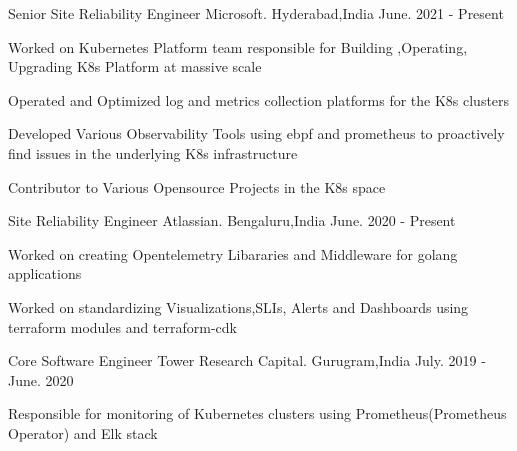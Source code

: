 

\begin{cventries}

    \cventry
    {Senior Site Reliability Engineer} %
    {Microsoft.} %
    {Hyderabad,India} %
    {June. 2021 - Present} %
    {
      \begin{cvitems} %
               \item { Worked on Kubernetes Platform team responsible for Building ,Operating, Upgrading K8s Platform at massive scale }
	       \item { Operated and  Optimized log and metrics collection platforms for the K8s clusters }
	       \item {Developed Various Observability Tools using ebpf and prometheus to proactively find issues in the underlying K8s infrastructure}
               \item { Contributor to Various Opensource Projects in the K8s space } 		
	  \end{cvitems}
    }
    \cventry
    {Site Reliability Engineer} %
    {Atlassian.} %
    {Bengaluru,India} %
    {June. 2020 - Present} %
    {
      \begin{cvitems} %
               \item { Worked on creating Opentelemetry Libararies and Middleware for golang applications }
               \item { Worked on standardizing Visualizations,SLIs, Alerts and Dashboards using terraform modules and terraform-cdk} 		
	  \end{cvitems}
    }
    \cventry
    {Core Software Engineer} %
    {Tower Research Capital.} %
    {Gurugram,India} %
    {July. 2019 - June. 2020} %
    {
      \begin{cvitems} %
	    \item { Responsible for monitoring of  Kubernetes clusters using Prometheus(Prometheus Operator) and Elk stack }

\end{cvitems}}
\end{cventries}
